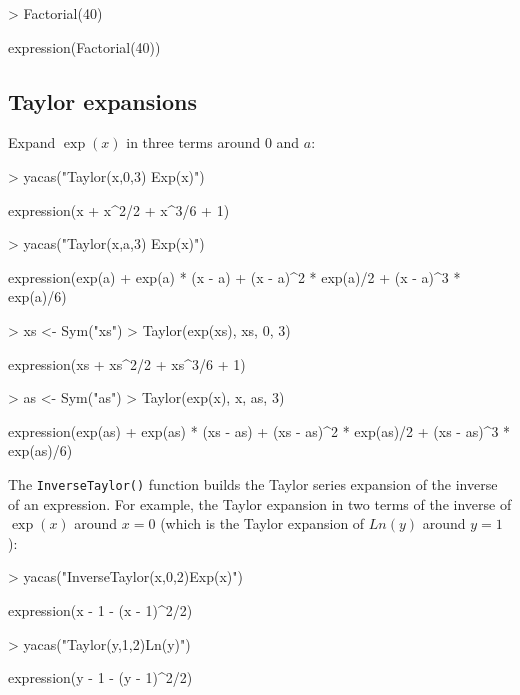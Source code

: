 \documentclass[]{article}
\newcommand{\code}[1]{{\tt #1}}
\begin{document}
\begin{Schunk}
\begin{Sinput}
> Factorial(40)
\end{Sinput}
\begin{Soutput}
expression(Factorial(40))
\end{Soutput}
\end{Schunk}

\subsection{Taylor expansions} 

Expand $\exp(x)$ in three terms
around $0$ and $a$:
\begin{Schunk}
\begin{Sinput}
> yacas("Taylor(x,0,3) Exp(x)")
\end{Sinput}
\begin{Soutput}
expression(x + x^2/2 + x^3/6 + 1)
\end{Soutput}
\begin{Sinput}
> yacas("Taylor(x,a,3) Exp(x)")
\end{Sinput}
\begin{Soutput}
expression(exp(a) + exp(a) * (x - a) + (x - a)^2 * exp(a)/2 + 
    (x - a)^3 * exp(a)/6)
\end{Soutput}
\end{Schunk}

\begin{Schunk}
\begin{Sinput}
> xs <- Sym("xs")
> Taylor(exp(xs), xs, 0, 3)
\end{Sinput}
\begin{Soutput}
expression(xs + xs^2/2 + xs^3/6 + 1)
\end{Soutput}
\begin{Sinput}
> as <- Sym("as")
> Taylor(exp(x), x, as, 3)
\end{Sinput}
\begin{Soutput}
expression(exp(as) + exp(as) * (xs - as) + (xs - as)^2 * exp(as)/2 + 
    (xs - as)^3 * exp(as)/6)
\end{Soutput}
\end{Schunk}

The \code{InverseTaylor()} function builds the Taylor series expansion of the
inverse of an expression. For example, the Taylor expansion in two
terms of the inverse of $\exp(x)$ around $x=0$ (which is the Taylor
expansion of $Ln(y)$ around $y=1$):
\begin{Schunk}
\begin{Sinput}
> yacas("InverseTaylor(x,0,2)Exp(x)")
\end{Sinput}
\begin{Soutput}
expression(x - 1 - (x - 1)^2/2)
\end{Soutput}
\begin{Sinput}
> yacas("Taylor(y,1,2)Ln(y)")
\end{Sinput}
\begin{Soutput}
expression(y - 1 - (y - 1)^2/2)
\end{Soutput}
\end{Schunk}
\end{document}

